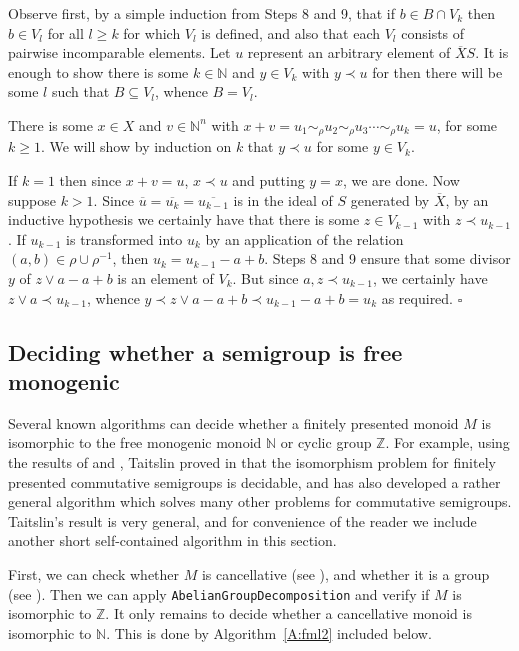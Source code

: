 \documentclass[12pt]{article}
\newenvironment{proof}{{\it Proof.\/}}{$\square$\\}
\begin{document}
\begin{proof}
Observe first, by a simple induction from Steps 8 and 9, that if
$b \in B \cap V_k$ then $b \in V_l$ for all $l \geq k$ for which
$V_l$ is defined, and also that each $V_l$ consists of pairwise
incomparable elements.
Let $u$ represent an arbitrary element of
$\overline{X}S$. It is enough to show there is some $k \in \mathbb{N}$ and
$y \in V_k$ with $y \prec u$ for then there will be some $l$ such that 
$B \subseteq V_l$, whence $B = V_l$. 

There is some
$x \in X$ and $v \in \mathbb{N}^n$ with
$x + v = u_1 \sim_\rho u_2 \sim_\rho u_3 \cdots \sim_\rho u_k = u$, for
some $k \geq 1$. We will show by induction on $k$ that $y \prec u$ for some
$y \in V_k$. 

If $k = 1$ then since
$x + v = u$, $x \prec u$ and putting $y = x$, we are done.
Now suppose $k > 1$.
Since $\overline{u} = \overline{u_k} = \overline{u_{k-1}}$
is in the ideal of $S$ generated by $\overline{X}$, by an inductive
hypothesis we certainly have
that there is some $z \in V_{k-1}$ with $z \prec u_{k-1}$.
If $u_{k-1}$ is transformed into $u_k$ by an application of the
relation $(a,b) \in \rho \cup \rho^{-1}$, then $u_k = u_{k-1} - a + b$.
Steps 8 and 9 ensure that  some divisor $y$ of  
$z \vee a -a + b$ is an element of $V_k$.
But since $a,z \prec  u_{k-1}$, we certainly have 
$z \vee a \prec u_{k-1}$, whence 
$y \prec z \vee a -a + b \prec u_{k-1} - a + b = u_k$
as required. 
\end{proof}

\subsection{Deciding whether a semigroup is free monogenic}\label{s:freemon}

Several known algorithms can decide whether a finitely presented
monoid $M$ is isomorphic to the free monogenic monoid 
$\mathbb{N}$ or cyclic group $\mathbb{Z}$. 
For example, using the results of \cite{p2} and \cite{p1},
Taitslin proved in \cite{taitslin} that the isomorphism problem
for finitely presented commutative semigroups is decidable, and 
has also developed a rather general algorithm which solves many 
other problems for commutative semigroups. Taitslin's result is 
very general, and for convenience of the reader we include 
another short self-contained algorithm in this section. 

First, we can check whether $M$ is cancellative (see \cite[Chapter 8]{bRG99}), 
and whether it is a group (see \cite{bRG99}). Then we can 
apply {\tt AbelianGroupDecomposition} and verify if $M$ is 
isomorphic to $\mathbb{Z}$. It only remains to decide 
whether a cancellative monoid is isomorphic to $\mathbb{N}$. 
This is done by Algorithm~\ref{A:fml2} included below.
\end{document}
